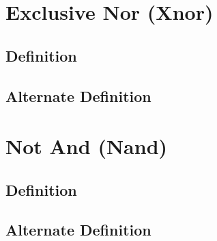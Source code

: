 \documentclass[11pt]{article}
\begin{document}
\section{Exclusive Nor (Xnor)}
\subsection{Definition}
\subsection{Alternate Definition}





\section{Not And (Nand)}
\subsection{Definition}
\subsection{Alternate Definition}
\end{document}
